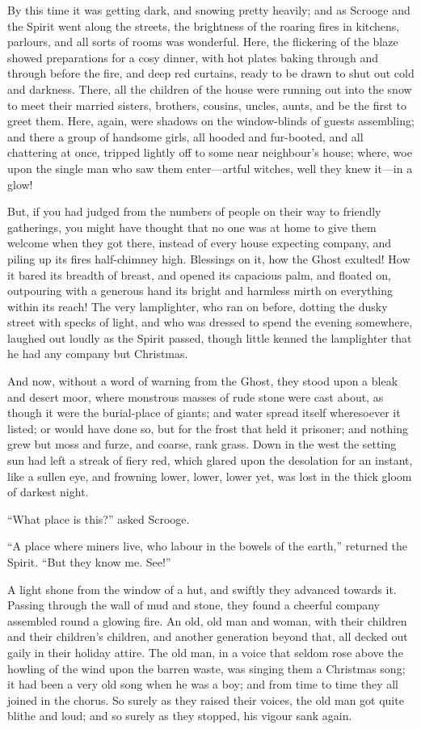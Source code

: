 \documentclass[paper=5.5in:8.5in,BCOR=15mm,twoside,DIV=15,headinclude=off,12pt,chapterprefix=off,openany,headings=huge]{scrbook} %
\begin{document}
By this time it was getting dark, and snowing pretty heavily; and as Scrooge and the Spirit went along the streets, the brightness of the roaring fires in kitchens, parlours, and all sorts of rooms was wonderful. Here, the flickering of the blaze showed preparations for a cosy dinner, with hot plates baking through and through before the fire, and deep red curtains, ready to be drawn to shut out cold and darkness. There, all the children of the house were running out into the snow to meet their married sisters, brothers, cousins, uncles, aunts, and be the first to greet them. Here, again, were shadows on the window-blinds of guests assembling; and there a group of handsome girls, all hooded and fur-booted, and all chattering at once, tripped lightly off to some near neighbour's house; where, woe upon the single man who saw them enter—artful witches, well they knew it—in a glow!

But, if you had judged from the numbers of people on their way to friendly gatherings, you might have thought that no one was at home to give them welcome when they got there, instead of every house expecting company, and piling up its fires half-chimney high. Blessings on it, how the Ghost exulted! How it bared its breadth of breast, and opened its capacious palm, and floated on, outpouring with a generous hand its bright and harmless mirth on everything within its reach! The very lamplighter, who ran on before, dotting the dusky street with specks of light, and who was dressed to spend the evening somewhere, laughed out loudly as the Spirit passed, though little kenned the lamplighter that he had any company but Christmas.

And now, without a word of warning from the Ghost, they stood upon a bleak and desert moor, where monstrous masses of rude stone were cast about, as though it were the burial-place of giants; and water spread itself wheresoever it listed; or would have done so, but for the frost that held it prisoner; and nothing grew but moss and furze, and coarse, rank grass. Down in the west the setting sun had left a streak of fiery red, which glared upon the desolation for an instant, like a sullen eye, and frowning lower, lower, lower yet, was lost in the thick gloom of darkest night.

\enquote{What place is this?} asked Scrooge.

\enquote{A place where miners live, who labour in the bowels of the earth,} returned the Spirit. \enquote{But they know me. See!}

A light shone from the window of a hut, and swiftly they advanced towards it. Passing through the wall of mud and stone, they found a cheerful company assembled round a glowing fire. An old, old man and woman, with their children and their children's children, and another generation beyond that, all decked out gaily in their holiday attire. The old man, in a voice that seldom rose above the howling of the wind upon the barren waste, was singing them a Christmas song; it had been a very old song when he was a boy; and from time to time they all joined in the chorus. So surely as they raised their voices, the old man got quite blithe and loud; and so surely as they stopped, his vigour sank again.
\end{document}

